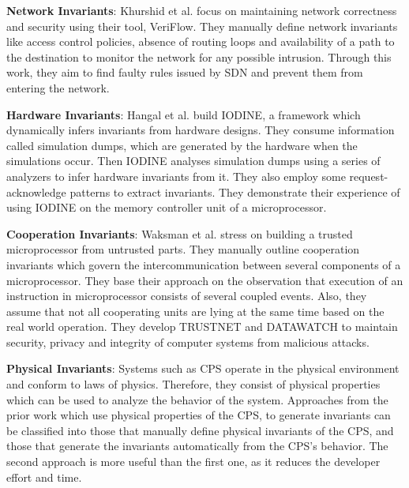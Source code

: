 \textbf {Network Invariants}: Khurshid et al.\cite{khurshid2012veriflow} focus on maintaining network correctness and security using their tool, VeriFlow. They manually define network invariants like access control policies, absence of routing loops and availability of a path to the destination to monitor the network for any possible intrusion. Through this work, they aim to find faulty rules issued by SDN and prevent them from entering the network.

\textbf {Hardware Invariants}: Hangal et al.\cite{hangal2005iodine} build IODINE, a framework which dynamically infers invariants from hardware designs. They consume information called simulation dumps, which are generated by the hardware when the simulations occur. Then IODINE analyses simulation dumps using a series of analyzers to infer hardware invariants from it. They also employ some request-acknowledge patterns to extract invariants. They demonstrate their experience of using IODINE on the memory controller unit of a microprocessor. 

\textbf{Cooperation Invariants}: Waksman et al.\cite{waksman2010tamper} stress on building a trusted microprocessor from untrusted parts. They manually outline cooperation invariants which govern the intercommunication between several components of a microprocessor. They base their approach on the observation that execution of an instruction in microprocessor consists of several coupled events. Also, they assume that not all cooperating units are lying at the same time based on the real world operation. They develop TRUSTNET and DATAWATCH to maintain security, privacy and integrity of computer systems from malicious attacks.

\textbf{Physical Invariants}: Systems such as CPS operate in the physical environment and conform to laws of physics. Therefore, they consist of physical properties which can be used to analyze the behavior of the system. Approaches from the prior work which use physical properties of the CPS, to generate invariants can be classified into those that manually define physical invariants of the CPS, and those that generate the invariants automatically from the CPS's behavior. The second approach is more useful than the first one, as it reduces the developer effort and time.

